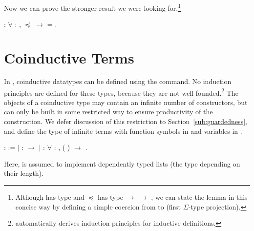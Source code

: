 Now we can prove the stronger result we were looking for.\footnote{Although
  \coqdocvariable{\ensuremath{\alpha}} has type
   and $\preceq$
  has type  $\rightarrow$
   $\rightarrow$ ,
  we can state the lemma in this concise way by defining a simple coercion
  from  to
   (first $\Sigma$-type
  projection).}
\begin{singlespace}
\begin{coqdoccode}
\coqdocnoindent
{}
:
\ensuremath{\forall} \coqdocvar{\ensuremath{\alpha}} :
,
\coqdocvariable{\ensuremath{\alpha}} \ensuremath{\preceq}
\ensuremath{\rightarrow}
\coqdocvariable{\ensuremath{\alpha}} =
.\coqdoceol
\end{coqdoccode}
\end{singlespace}


\section{Coinductive Terms}

In \Coq, coinductive datatypes can be defined using the 
command. No induction principles are defined for these types, because they are
not well-founded.\footnote{\Coq automatically derives induction principles for
  inductive definitions.} The objects of a coinductive type may contain an
infinite number of constructors, but can only be built in some restricted way
to ensure productivity of the construction.
We defer discussion of this restriction to Section~\ref{sub:guardedness}, and
define the type  of infinite terms
with function symbols in  and variables in .
\begin{singlespace}
\begin{coqdoccode}
\coqdocnoindent
{}  :
 :=\coqdoceol
\coqdocindent{1.00em}
\ensuremath{|}  : 
\ensuremath{\rightarrow} \coqdoceol
\coqdocindent{1.00em}
\ensuremath{|}  :
\ensuremath{\forall}  : ,
( )
\ensuremath{\rightarrow} .\coqdoceol
\end{coqdoccode}
\end{singlespace}
Here,  is assumed to
implement dependently typed lists (the type depending on their length).

